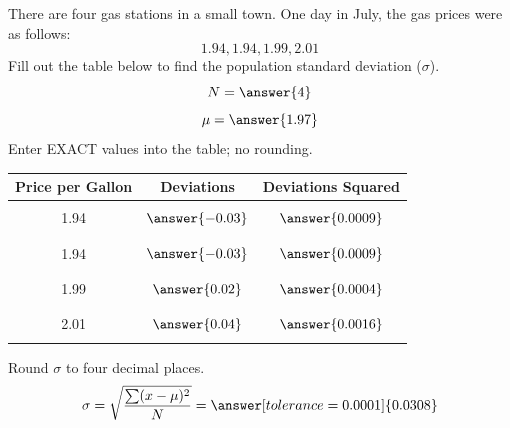 \documentclass{ximera}
\begin{document}
\begin{problem}\label{prob:140hom3prob2}
There are four gas stations in a small town.  One day in July, the gas prices were as follows:
$$1.94, 1.94, 1.99, 2.01$$
Fill out the table below to find the population standard deviation ($\sigma$).
$$N=\answer{4}$$
$$\mu=\answer{1.97}$$
Enter EXACT values into the table; no rounding.
\begin{center}
\begin{tabular}{|c|c|c|}
Price per Gallon & Deviations & Deviations Squared  \\
 \hline
 \hline
   & &\\
 1.94 &$\answer{-0.03}$  & $\answer{0.0009}$ \\
  & &\\
  \hline
   & &\\
 1.94 &$\answer{-0.03}$  & $\answer{0.0009}$\\
  & &\\
 \hline
  & &\\
 1.99 &$\answer{0.02}$ &$\answer{0.0004}$ \\
  & &\\
 \hline
  & &\\
 2.01 &$\answer{0.04}$  &$\answer{0.0016}$ \\
  & &\\
 \hline
 
\end{tabular}
\end{center}
Round $\sigma$ to four decimal places.
$$\sigma =\sqrt{\frac{\sum (x-\mu)^2}{N}}=\answer[tolerance=0.0001]{0.0308}$$
\end{problem}
\end{document}
